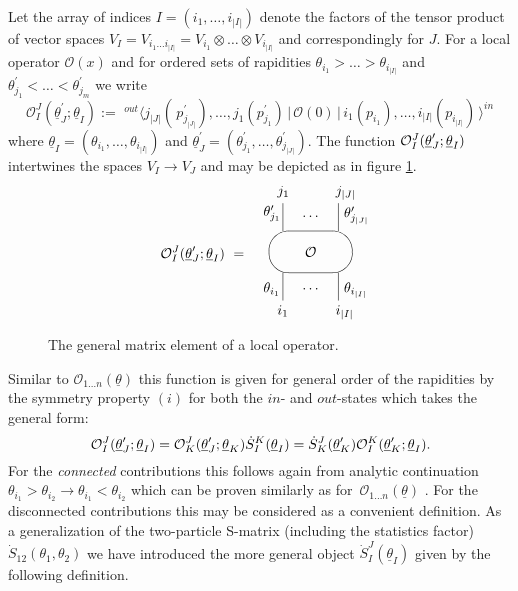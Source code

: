 \documentclass[a4paper,a4paper]{article}
\begin{document}
Let the array of indices $I=(i_{1},\dots ,i_{|I|})$ denote the factors of
the tensor product of vector spaces $V_{I}=V_{i_{1}\dots
i_{|I|}}=V_{i_{1}}\otimes \dots \otimes V_{i_{|I|}}$ and correspondingly for 
$J$. For a local operator $\mathcal{O}(x)$ and for ordered sets of
rapidities $\theta _{i_{1}}>\dots >\theta _{i_{|I|}}$ and $\theta
_{j_{1}}^{\prime }<\dots <\theta _{j_{m}}^{\prime }$ we write 
\begin{equation}
\mathcal{O}_{I}^{J}(\underline{\theta }_{J}^{\prime };\underline{\theta }%
_{I}):=\,^{~out}\langle j_{|J|}(\,p_{j_{|J|}}^{\prime }),\dots
,j_{1}(p_{j_{1}}^{\prime })\,|\,\mathcal{O}(0)\,|\,i_{1}(p_{i_{1}}),\dots
,i_{|I|}(p_{i_{|I|}})\,\rangle ^{in}  \label{dcr}
\end{equation}
where $\underline{\theta }_{I}=(\theta _{i_{1}},\dots ,\theta _{i_{|I|}})$
and $\underline{\theta }_{J}^{\prime }=(\theta _{j_{1}}^{\prime },\dots
,\theta _{j_{|J|}}^{\prime })$. The function $\mathcal{O}_{I}^{J}(\underline{%
\theta }_{J}^{\prime };\underline{\theta }_{I})$ intertwines the spaces $%
V_{I}\rightarrow V_{J}$ and may be depicted as in figure \ref{fcr1}. 
\begin{figure}[tbh]
\[
\mathcal{O}_{I}^{J}(\underline{\theta }_{J}^{\prime };\underline{\theta }%
_{I})~=~~~ 
\begin{array}{c}
\unitlength .35mm\begin{picture}(60,90) \put(30,45){\oval(60,30)[]}
\put(30,45){\makebox(0,0)[cc]{$\cal O$}} \put(10,10){\line(0,1){20}}
\put(50,10){\line(0,1){20}} \put(10,60){\line(0,1){20}}
\put(50,60){\line(0,1){20}} \put(-4,16){$\theta_{i_1}$} \put(6,0){${i_1}$}
\put(24,18){$\dots$} \put(54,16){$\theta_{i_{|I|}}$} \put(48,0){${i_{|I|}}$}
\put(-4,71){$\theta'_{j_1}$} \put(6,86){${j_1}$} \put(24,70){$\dots$}
\put(54,70){$\theta'_{j_{|J|}}$} \put(48,86){${j_{|J|}}$} \end{picture}
\end{array}
\]
\caption{The general matrix element of a local operator.}
\label{fcr1}
\end{figure}
Similar to $\mathcal{O}_{1\dots n}(\underline{\theta })$ this function is
given for general order of the rapidities by the symmetry property $(i)$ for
both the $in$- and $out$-states which takes the general form: 
\[
\,\mathcal{O}_{I}^{J}(\underline{\theta }_{J}^{\prime };\underline{\theta }%
_{I})=\mathcal{O}_{K}^{J}(\underline{\theta }_{J}^{\prime };\underline{%
\theta }_{K})\dot{S}_{I}^{K}(\underline{\theta }_{I})=\dot{S}_{K}^{J}(%
\underline{\theta }_{K}^{\prime })\mathcal{O}_{I}^{K}(\underline{\theta }%
_{K}^{\prime };\underline{\theta }_{I}). 
\]
For the \emph{connected }contributions this follows again from analytic
continuation $\theta _{i_{1}}>\theta _{i_{2}}\rightarrow \theta
_{i_{1}}<\theta _{i_{2}}$ which can be proven similarly as for $\,\mathcal{O}%
_{1\dots n}(\underline{\theta })$ \cite{BFKZ}. For the disconnected
contributions this may be considered as a convenient definition. As a
generalization of the two-particle S-matrix (including the statistics
factor) $\dot{S}_{12}(\theta _{1},\theta _{2})$ we have introduced the more
general object $\dot{S}_{I}^{J}(\underline{\theta }_{I})$ given by the
following definition.
\end{document}
